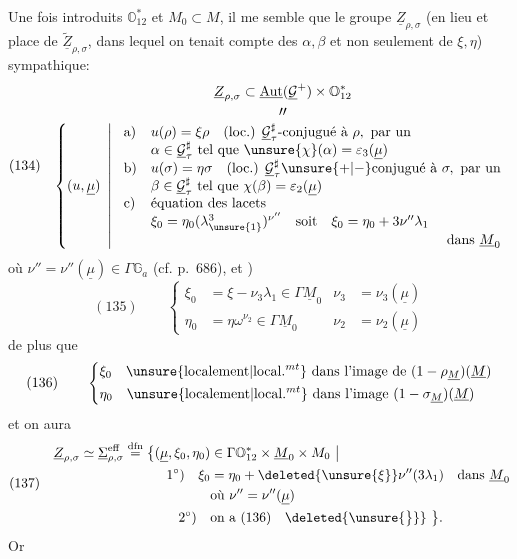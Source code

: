 Une fois introduits \(\mathbb O_{12}^{*}\) et \(M_0\subset M\), il me
semble que le groupe \(\underline Z_{\rho,\sigma}\) (en lieu
et place de \(\underline{\widetilde Z}_{\rho,\sigma}\), dans lequel on tenait
compte des \(\alpha,\beta\) et non seulement
de \(\xi,\eta\))  sympathique:
\[
(134)\quad
\begin{gathered}
\underline Z_{\rho,\sigma}\subset
\underline{\operatorname{Aut}}(\underline{\mathcal G}^{+})\times\mathbb O_{12}^{*}
\\[-2pt]
\text{\(\prime\prime\)}\\[-2pt]
\left\{(u,\underline\mu)\ \left|\
\begin{array}{ll}
\text{a)}&u(\rho)=\xi\rho\quad\text{(loc.) }\underline{\mathcal G}_{\tau}^{\sharp}\text{-conjugué à }\rho,\text{ par un}\\
&\alpha\in\underline{\mathcal G}_{\tau}^{\sharp}\text{ tel que }\unsure{\chi}(\alpha)=\varepsilon_3(\underline\mu)\\
\text{b)}&u(\sigma)=\eta\sigma\quad\text{(loc.) }\underline{\mathcal G}_{\tau}^{\sharp}\unsure{+|-}\text{conjugué à }\sigma,\text{ par un}\\
&\beta\in\underline{\mathcal G}_{\tau}^{\sharp}\text{ tel que }\chi(\beta)=\varepsilon_2(\underline\mu)\\
\text{c)}&\text{équation des lacets}\\
&\xi_0=\eta_0(\lambda_{\unsure{1}}^3)^{\nu''}\quad\text{soit}\quad\xi_0=\eta_0+3\nu''\lambda_1\\
&\hfill\text{dans }\underline M_0
\end{array}\right.\right.
\end{gathered}
\]
où \(\nu''=\nu''(\underline\mu)\in\Gamma\mathbb G_a\)
(cf.  p.~686), et )
\[
(135)\qquad
\left\{\begin{aligned}
\xi_0&=\xi-\nu_3\lambda_1\in\Gamma\underline M_0
&\nu_3&=\nu_3(\underline\mu)\\
\eta_0&=\eta\omega^{\nu_2}\in\Gamma\underline M_0
&\nu_2&=\nu_2(\underline\mu)
\end{aligned}\right.
\]
   de plus que
\[
(136)\qquad
\left\{\begin{aligned}
&\xi_0\quad\text{\unsure{localement|local.\(^{mt}\)} dans l'image de }(1-\rho_{\underline M})(\underline M)\\
&\eta_0\quad\text{\unsure{localement|local.\(^{mt}\)} dans l'image }(1-\sigma_{\underline M})(\underline M)
\end{aligned}\right.
\]
et on aura
\[
(137)\quad
\begin{aligned}
\underline Z_{\rho,\sigma}\simeq\underline\Sigma_{\rho,\sigma}^{\mathrm{eff}}
\overset{\mathrm{dfn}}{=}
\bigl\{(\underline\mu,\xi_0,\eta_0)&\in\Gamma\mathbb O_{12}^{*}\times\underline M_0\times M_0\ \big|\\
1^\circ)\quad\xi_0&=\eta_0+\deleted{\unsure{\xi}}\nu''(3\lambda_1)\quad\text{dans }\underline M_0\\
&\text{où }\nu''=\nu''(\underline\mu)\\
2^\circ)\quad&\text{on a }(136)\quad\deleted{\unsure{\bigr\}}}\ \bigr\}.
\end{aligned}
\]
Or

